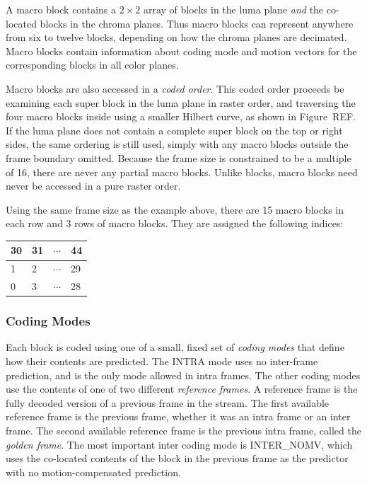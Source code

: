 \documentclass[11pt,letterpaper]{article}
\newcommand{\term}[1]{{\em #1}}
\begin{document}
A macro block contains a $2\times 2$ array of blocks in the luma plane
 {\em and} the co-located blocks in the chroma planes.
Thus macro blocks can represent anywhere from six to twelve blocks, depending
 on how the chroma planes are decimated.
Macro blocks contain information about coding mode and motion vectors for the
 corresponding blocks in all color planes.

Macro blocks are also accessed in a \term{coded order}.
This coded order proceeds be examining each super block in the luma plane in
 raster order, and traversing the four macro blocks inside using a smaller
 Hilbert curve, as shown in Figure~REF.
If the luma plane does not contain a complete super block on the top or right
 sides, the same ordering is still used, simply with any macro blocks outside
 the frame boundary omitted.
Because the frame size is constrained to be a multiple of 16, there are never
 any partial macro blocks.
Unlike blocks, macro blocks need never be accessed in a pure raster order.


Using the same frame size as the example above, there are 15 macro blocks in
 each row and 3 rows of macro blocks.
They are assigned the following indices:

\vspace{\baselineskip}
\begin{tabular}{|l|l|c|l|}\hline
30 & 31 & $\cdots$ & 44 \\\hline
 1 &  2 & $\cdots$ & 29 \\\hline
 0 &  3 & $\cdots$ & 28 \\\hline
\end{tabular}
\vspace{\baselineskip}

\subsubsection{Coding Modes}

Each block is coded using one of a small, fixed set of \term{coding modes} that
 define how their contents are predicted.
The INTRA mode uses no inter-frame prediction, and is the only mode allowed in
 intra frames.
The other coding modes use the contents of one of two different \term{reference
 frames}.
A reference frame is the fully decoded version of a previous frame in the
 stream.
The first available reference frame is the previous frame, whether it was an
 intra frame or an inter frame.
The second available reference frame is the previous intra frame, called the
 \term{golden frame}.
The most important inter coding mode is INTER\_NOMV, which uses the co-located
 contents of the block in the previous frame as the predictor with no
 motion-compensated prediction.
\end{document}
